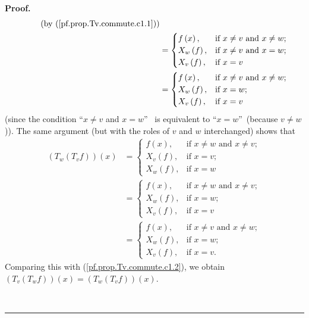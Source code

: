 \documentclass[numbers=enddot,12pt,final,onecolumn,notitlepage]{scrartcl}%
\theoremstyle{definition}
\newenvironment{verlong}{}{}
\newenvironment{proof}[1][Proof]{\noindent\textbf{#1.} }{\ \rule{0.5em}{0.5em}}
\begin{document}
\begin{verlong}
\begin{proof}
\begin{align}
\ \ \ \ \ \ \ \ \ \ \left(  \text{by (\ref{pf.prop.Tv.commute.c1.1})}\right)
\nonumber\\
&  =%
\begin{cases}
f\left(  x\right)  , & \text{if }x\neq v\text{ and }x\neq w;\\
X_{w}\left(  f\right)  , & \text{if }x\neq v\text{ and }x=w;\\
X_{v}\left(  f\right)  , & \text{if }x=v
\end{cases}
\nonumber\\
&  =%
\begin{cases}
f\left(  x\right)  , & \text{if }x\neq v\text{ and }x\neq w;\\
X_{w}\left(  f\right)  , & \text{if }x=w;\\
X_{v}\left(  f\right)  , & \text{if }x=v
\end{cases}
\label{pf.prop.Tv.commute.c1.2}%
\end{align}
(since the condition \textquotedblleft$x\neq v$ and $x=w$\textquotedblright%
\ is equivalent to \textquotedblleft$x=w$\textquotedblright\ (because $v\neq
w$)). The same argument (but with the roles of $v$ and $w$ interchanged) shows
that%
\begin{align*}
\left(  T_{w}\left(  T_{v}f\right)  \right)  \left(  x\right)   &  =%
\begin{cases}
f\left(  x\right)  , & \text{if }x\neq w\text{ and }x\neq v;\\
X_{v}\left(  f\right)  , & \text{if }x=v;\\
X_{w}\left(  f\right)  , & \text{if }x=w
\end{cases}
\\
&  =%
\begin{cases}
f\left(  x\right)  , & \text{if }x\neq w\text{ and }x\neq v;\\
X_{w}\left(  f\right)  , & \text{if }x=w;\\
X_{v}\left(  f\right)  , & \text{if }x=v
\end{cases}
\\
&  =%
\begin{cases}
f\left(  x\right)  , & \text{if }x\neq v\text{ and }x\neq w;\\
X_{w}\left(  f\right)  , & \text{if }x=w;\\
X_{v}\left(  f\right)  , & \text{if }x=v.
\end{cases}
\end{align*}
Comparing this with (\ref{pf.prop.Tv.commute.c1.2}), we obtain $\left(
T_{v}\left(  T_{w}f\right)  \right)  \left(  x\right)  =\left(  T_{w}\left(
T_{v}f\right)  \right)  \left(  x\right)  $.


\end{proof}
\end{verlong}
\end{document}
